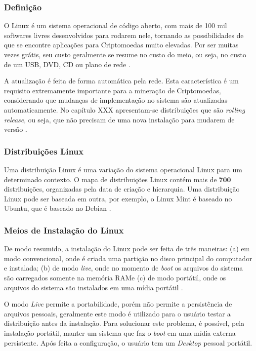 \documentclass[
article,			%
12pt,				%
openright,			%
oneside,			%
a4paper,			%
chapter=TITLE,		%
section=TITLE,		%
subsection=TITLE,	%
subsubsection=TITLE,%
subsubsubsection=TITLE, %
english,			%
brazil,				%
]{abntex2}
\begin{document}
\subsubsection{Definição}

O Linux é um sistema operacional de código aberto, com mais de 100 mil
softwares livres desenvolvidos para rodarem nele, tornando as
possibilidades de que se encontre aplicações para Criptomoedas muito
elevadas. Por ser muitas vezes grátis, seu custo geralmente se resume
no custo do meio, ou seja, no custo de um USB, DVD, CD ou plano de
rede \cite{Nunes2009}.

A atualização é feita de forma automática pela rede. Esta
característica é um requisito extremamente importante para a mineração
de Criptomoedas, considerando que mudanças de implementação no sistema
são atualizadas automaticamente. No capítulo XXX apresentam-se
distribuições que são \emph{rolling release}, ou seja, que não
precisam de uma nova instalação para mudarem de versão
\cite{Nunes2009, ArchWiki2018a}.

\subsubsection{Distribuições Linux}\label{cap:distribuicoes-linux}

Uma distribuição Linux é uma variação do sistema operacional Linux
para um determinado contexto. O mapa de distribuições Linux contém
mais de $\mathbf{700}$ distribuições, organizadas pela data de criação
e hierarquia. Uma distribuição Linux pode ser baseada em outra, por
exemplo, o Linux Mint é baseado no Ubuntu, que é baseado no Debian
\cite{Loli2017}.


\subsubsection{Meios de Instalação do Linux}

De modo resumido, a instalação do Linux pode ser feita de três
maneiras: (a) em modo convencional, onde é criada uma partição no
disco principal do computador e instalada; (b) de modo \emph{live},
onde no momento de \emph{boot} os arquivos do sistema são carregados
somente na memória RAM\@ e (c) de modo portátil, onde os arquivos do
sistema são instalados em uma mídia portátil \cite{Nunes2009}.

O modo \emph{Live} permite a portabilidade, porém não permite a
persistência de arquivos pessoais, geralmente este modo é utilizado
para o usuário testar a distribuição antes da instalação. Para
solucionar este problema, é possível, pela instalação portátil, manter
um sistema que faz o \emph{boot} em uma mídia externa persistente.
Após feita a configuração, o usuário tem um \emph{Desktop} pessoal
portátil.
\end{document}
